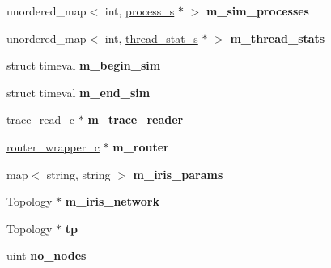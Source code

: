 \begin{DoxyCompactItemize}
\item 
\hypertarget{classmacsim__c_a04c5be42aae87b1b4dc8398b40c4bebc}{
unordered\_\-map$<$ int, \hyperlink{structprocess__s}{process\_\-s} $\ast$ $>$ {\bfseries m\_\-sim\_\-processes}}
\label{classmacsim__c_a04c5be42aae87b1b4dc8398b40c4bebc}

\item 
\hypertarget{classmacsim__c_a82e823eac7f1edaef124ae20edb8b905}{
unordered\_\-map$<$ int, \hyperlink{structthread__stat__s}{thread\_\-stat\_\-s} $\ast$ $>$ {\bfseries m\_\-thread\_\-stats}}
\label{classmacsim__c_a82e823eac7f1edaef124ae20edb8b905}

\item 
\hypertarget{classmacsim__c_ad66c0fae20f8da217136c93789aa552d}{
struct timeval {\bfseries m\_\-begin\_\-sim}}
\label{classmacsim__c_ad66c0fae20f8da217136c93789aa552d}

\item 
\hypertarget{classmacsim__c_ad150572cf94097d5bb0e302e7ee36735}{
struct timeval {\bfseries m\_\-end\_\-sim}}
\label{classmacsim__c_ad150572cf94097d5bb0e302e7ee36735}

\item 
\hypertarget{classmacsim__c_a717e3a5b0427dfbb69a8fa545f2a02be}{
\hyperlink{classtrace__read__c}{trace\_\-read\_\-c} $\ast$ {\bfseries m\_\-trace\_\-reader}}
\label{classmacsim__c_a717e3a5b0427dfbb69a8fa545f2a02be}

\item 
\hypertarget{classmacsim__c_a49d3f59d80273b9706879c58a6019a4b}{
\hyperlink{classrouter__wrapper__c}{router\_\-wrapper\_\-c} $\ast$ {\bfseries m\_\-router}}
\label{classmacsim__c_a49d3f59d80273b9706879c58a6019a4b}

\item 
\hypertarget{classmacsim__c_a8ea8fcd8da294b674cdfa2b894052698}{
map$<$ string, string $>$ {\bfseries m\_\-iris\_\-params}}
\label{classmacsim__c_a8ea8fcd8da294b674cdfa2b894052698}

\item 
\hypertarget{classmacsim__c_a0fe5a937f6d33cc093ff4c65b837061c}{
Topology $\ast$ {\bfseries m\_\-iris\_\-network}}
\label{classmacsim__c_a0fe5a937f6d33cc093ff4c65b837061c}

\item 
\hypertarget{classmacsim__c_a37bad1fa5d96c92c437f4be6d4d343e6}{
Topology $\ast$ {\bfseries tp}}
\label{classmacsim__c_a37bad1fa5d96c92c437f4be6d4d343e6}

\item 
\hypertarget{classmacsim__c_acdb35ca43741de0d9a8f9602500ca8f7}{
uint {\bfseries no\_\-nodes}}
\label{classmacsim__c_acdb35ca43741de0d9a8f9602500ca8f7}


\end{DoxyCompactItemize}
